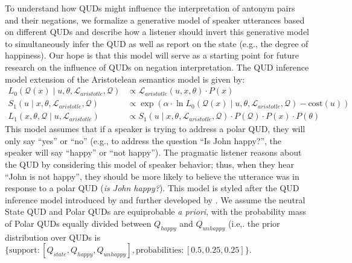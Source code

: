 \documentclass[floatsintext,doc]{apa6}
\begin{document}
To understand how QUDs might influence the interpretation of antonym pairs and their negations, we formalize a generative model of speaker utterances based on different QUDs and describe how a listener should invert this generative model to simultaneously infer the QUD as well as report on the state (e.g., the degree of happiness). 
Our hope is that this model will serve as a starting point for future research on the influence of QUDs on negation interpretation. 
The QUD inference model extension of the Aristotelean semantics model is given by: 
%
\begin{align}
L_{0}(\mathcal{Q}(x) \mid u, \theta, \mathcal{L}_{aristotle}, \mathcal{Q}) &\propto \mathcal{L}_{aristotle}(u, x, \theta) \cdot P(x) \label{eq:L0q} \\
S_{1}(u \mid x, \theta, \mathcal{L}_{aristotle}, \mathcal{Q}) &\propto \exp{(\alpha \cdot \ln {L_{0}(\mathcal{Q}(x) \mid u, \theta, \mathcal{L}_{aristotle}, \mathcal{Q})} - \text{cost}(u))} \label{eq:S1q}\\
L_{1}(x, \theta, \mathcal{Q} \mid u,  \mathcal{L}_{aristotle}) &\propto S_{1}(u \mid x, \theta, \mathcal{L}_{aristotle}, \mathcal{Q}) \cdot P(\mathcal{Q}) \cdot P(x) \cdot  P(\theta) \label{eq:L1q}
\end{align}
%
This model assumes that if a speaker is trying to address a polar QUD, they will only say ``yes'' or ``no'' (e.g., to address the question ``Is John happy?'', the speaker will say ``happy'' or ``not happy''). 
The pragmatic listener reasons about the QUD by considering this model of speaker behavior; thus, when they hear ``John is not happy'', they should be more likely to believe the utterance was in response to a polar QUD (\emph{is John happy?}). 
This model is styled after the QUD inference model introduced by  and further developed by .
We assume the neutral State QUD and Polar QUDs are equiprobable \emph{a priori}, with the probability mass of Polar QUDs equally divided between $Q_{happy}$ and $Q_{unhappy}$ (i.e,. the prior distribution over QUDs is $\{\text{support}: [Q_{state}, Q_{happy}, Q_{unhappy}], \text{probabilities}: [0.5, 0.25, 0.25]\}$.
\end{document}
